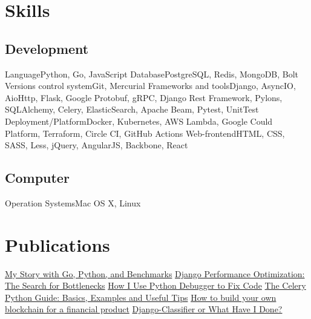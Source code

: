 \documentclass[11pt,a4paper,oneside]{moderncv}
\begin{document}
    \maketitle

    \section{Skills}
        \subsection{Development}
            \cvline
                {Language}{Python, Go, JavaScript}
            \cvline
                {Database}{PostgreSQL, Redis, MongoDB, Bolt}
            \cvline
                {Versions control system}{Git, Mercurial}
            \cvline
                {Frameworks and tools}{Django, AsyncIO, AioHttp, Flask, Google Protobuf, gRPC, Django Rest Framework, Pylons, SQLAlchemy, Celery, ElasticSearch, Apache Beam, Pytest, UnitTest}
            \cvline
                {Deployment/Platform}{Docker, Kubernetes, AWS Lambda, Google Could Platform, Terraform, Circle CI, GitHub Actions}
            \cvline
                {Web-frontend}{HTML, CSS, SASS, Less, jQuery, AngularJS, Backbone, React}

        \subsection{Computer}
            \cvline
                {Operation Systems}{Mac OS X, Linux}

    \section{Publications}
        \cvlistitem
            {\href{https://djangostars.com/blog/my-story-with-golang/}{My Story with Go, Python, and Benchmarks}}
        \cvlistitem
            {\href{https://medium.com/free-code-camp/django-performance-optimization-looking-for-the-bottlenecks-8583789e341b}{Django Performance Optimization: The Search for Bottlenecks}}
        \cvlistitem
            {\href{https://codeburst.io/how-i-use-python-debugger-to-fix-code-279f11f75866}{How I Use Python Debugger to Fix Code}}
        \cvlistitem
            {\href{https://codeburst.io/the-celery-python-guide-basics-examples-and-useful-tips-d8da1fcfaea3}{The Celery Python Guide: Basics, Examples and Useful Tips}}
        \cvlistitem
            {\href{https://djangostars.com/blog/how-to-build-your-own-blockchain-for-a-financial-product/}{How to build your own blockchain for a financial product}}
        \cvlistitem
            {\href{https://medium.com/free-code-camp/django-classifier-or-what-have-i-done-4a8164358c09}{Django-Classifier or What Have I Done?}}
\end{document}
